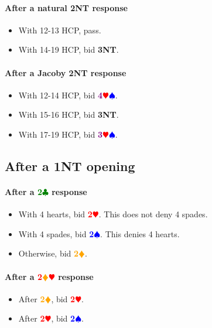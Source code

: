 \documentclass{article}
\newcommand{\Hs}{\textcolor{Red}{$\varheart$}}
\newcommand{\Ss}{\textcolor{Blue}{$\spadesuit$}}
\newcommand{\Ds}{\textcolor{Orange}{$\vardiamond$}}
\newcommand{\Cs}{\textcolor{Green}{$\clubsuit$}}
\newcommand{\NTs}{\textbf{\footnotesize{NT}}}
\renewcommand{\H}[1]{\textcolor{Red}{\textbf{#1}\Hs}}
\renewcommand{\S}[1]{\textcolor{Blue}{\textbf{#1}\Ss}}
\newcommand{\D}[1]{\textcolor{Orange}{\textbf{#1}\Ds}}
\newcommand{\C}[1]{\textcolor{Green}{\textbf{#1}\Cs}}
\newcommand{\NT}[1]{\textbf{#1\NTs}}
\newcommand{\majors}[1]{\textcolor{Purple}{\textbf{#1}}\Hs\Ss}
\newcommand{\reds}[1]{\textcolor{Red}{\textbf{#1}}\Ds\Hs}
\begin{document}
\paragraph{After a natural \NT{2} response}

\begin{itemize}
\item With 12-13 HCP, pass.
\item With 14-19 HCP, bid \NT{3}.
\end{itemize}

\paragraph{After a Jacoby \NT{2} response}

\begin{itemize}
\item With 12-14 HCP, bid \majors{4}.
\item With 15-16 HCP, bid \NT{3}.
\item With 17-19 HCP, bid \majors{3}.
\end{itemize}



\subsection{After a \NT{1} opening}

\paragraph{After a \C{2} response}

\begin{itemize}
\item With 4 hearts, bid \H{2}. This does not deny 4 spades.
\item With 4 spades, bid \S{2}. This denies 4 hearts.
\item Otherwise, bid \D{2}.
\end{itemize}

\paragraph{After a \reds{2}  response}

\begin{itemize}
\item After \D{2}, bid \H{2}.
\item After \H{2}, bid \S{2}.
\end{itemize}
\end{document}
